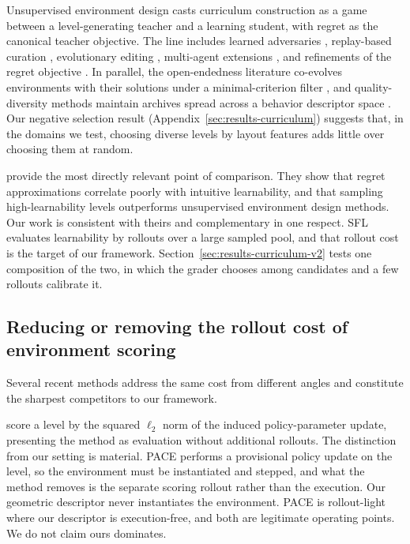 \documentclass[twoside]{article}
\begin{document}
Unsupervised environment design \citep{dennis2020emergent} casts curriculum construction as a game between a level-generating teacher and a learning student, with regret as the canonical teacher objective. The line includes learned adversaries \citep{dennis2020emergent}, replay-based curation \citep{jiang2021prioritized, jiang2021replay}, evolutionary editing \citep{parker2022evolving}, multi-agent extensions \citep{samvelyan2023maestro}, and refinements of the regret objective \citep{beukman2024refining}. In parallel, the open-endedness literature co-evolves environments with their solutions under a minimal-criterion filter \citep{brant2017minimal, wang2019poet, wang2020enhanced}, and quality-diversity methods maintain archives spread across a behavior descriptor space \citep{mouret2015illuminating}. Our negative selection result (Appendix~\ref{sec:results-curriculum}) suggests that, in the domains we test, choosing diverse levels by layout features adds little over choosing them at random.

\citet{rutherford2024no} provide the most directly relevant point of comparison. They show that regret approximations correlate poorly with intuitive learnability, and that sampling high-learnability levels outperforms unsupervised environment design methods. Our work is consistent with theirs and complementary in one respect. SFL evaluates learnability by rollouts over a large sampled pool, and that rollout cost is the target of our framework. Section~\ref{sec:results-curriculum-v2} tests one composition of the two, in which the grader chooses among candidates and a few rollouts calibrate it.

\subsection{Reducing or removing the rollout cost of environment scoring}

Several recent methods address the same cost from different angles and constitute the sharpest competitors to our framework.

\citet{yuan2026pace} score a level by the squared $\ell_2$ norm of the induced policy-parameter update, presenting the method as evaluation without additional rollouts. The distinction from our setting is material. PACE performs a provisional policy update on the level, so the environment must be instantiated and stepped, and what the method removes is the separate scoring rollout rather than the execution. Our geometric descriptor never instantiates the environment. PACE is rollout-light where our descriptor is execution-free, and both are legitimate operating points. We do not claim ours dominates.
\end{document}
